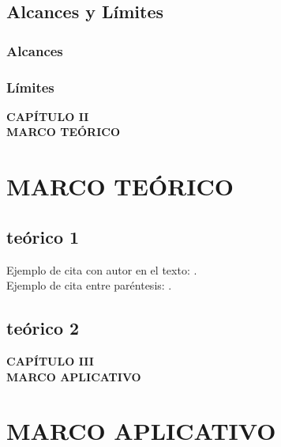 \documentclass[11pt,oneside,letterpaper]{book}
\begin{document}
\section{Alcances y Límites}
\lipsum[1]

\subsection{Alcances}
\lipsum[1]

\subsection{Límites}
\lipsum[1]

\newpage
\thispagestyle{empty}
\vspace*{0.35\textheight}
\begin{center}
	{\Huge\textbf{CAPÍTULO II}} \\[0.5cm]
	{\Huge\textbf{MARCO TEÓRICO}}
\end{center}

\newpage
\chapter{MARCO TEÓRICO}
\thispagestyle{fancy}
\section{teórico 1}
\lipsum[1]
Ejemplo de cita con autor en el texto: \textcite{perez2021educacion}.\\
Ejemplo de cita entre paréntesis: \parencite{smith2020ai}.

\section{teórico 2}
\lipsum[1]

\newpage
\thispagestyle{empty}
\vspace*{0.35\textheight}
\begin{center}
	{\Huge\textbf{CAPÍTULO III}} \\[0.5cm]
	{\Huge\textbf{MARCO APLICATIVO}}
\end{center}

\newpage
\chapter{MARCO APLICATIVO}
\thispagestyle{fancy}
\end{document}

